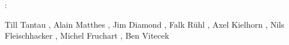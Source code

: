 \textbf{}:

Till Tantau  ,
Alain Matthes ,
Jim Diamond ,
Falk Rühl ,
Axel Kielhorn ,
Nils Fleischhacker ,
Michel Fruchart ,
Ben Vitecek